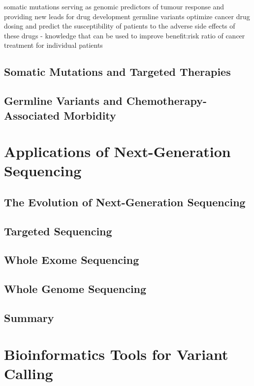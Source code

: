 somatic mutations serving as genomic predictors of tumour response and providing new leads for drug development
germline variants optimize cancer drug dosing and predict the susceptibility of patients to the adverse side effects of these drugs - knowledge that can be used to improve benefit:risk ratio of cancer treatment for individual patients

\subsection{Somatic Mutations and Targeted Therapies}


\subsection{Germline Variants and Chemotherapy-Associated Morbidity}

\section{Applications of Next-Generation Sequencing}
\label{sec:ApplicationsofNext-GenerationSequencing}

\subsection{The Evolution of Next-Generation Sequencing}

\subsection{Targeted Sequencing}

\subsection{Whole Exome Sequencing}

\subsection{Whole Genome Sequencing}

\subsection{Summary}

\section{Bioinformatics Tools for Variant Calling}
\label{sec:BioinformaticsToolsforVariantCalling}

